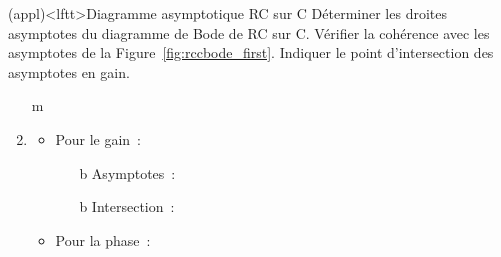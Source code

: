\documentclass[../../main/main.tex]{subfiles}
\begin{document}
\begin{tcb*}(appl)<lftt>{Diagramme asymptotique RC sur C}
	Déterminer les droites asymptotes du diagramme de Bode de RC sur C. Vérifier
	la cohérence avec les asymptotes de la Figure~\ref{fig:rccbode_first}.
	Indiquer le point d'intersection des asymptotes en gain.
	\tcblower
	\vspace{12pt}
	\begin{enumerate}
		\item[m]
		      \psw{%
			      \[
				      \boxed{
					      \Hu(x) \opto{}{x\to 0} \frac{1}{1 + 0} = 1
					      \qet
					      \Hu(x) \opto{}{x\to \infty} \frac{1}{\jx}
				      }%
			      \]
		      }%
		      \vspace{-15pt}
		\item
		      \begin{itemize}
			      \item Pour le gain~:
			            \begin{itemize}
				            \item[b]{Asymptotes}~:
				            \item[b]{Intersection}~:
				                  \vspace{-25pt}
			            \end{itemize}
			      \item Pour la phase~:
			            \psw{%
				            \[
					            \f(x) \opto{}{x\to 0} \arg*{1} = 0
					            \qet
					            \f(x) \opto{}{x\to \infty} \arg*{\frac{1}{\jx}} = -\frac{\pi}{2}
				            \]
			            }%
			            \vspace{-15pt}
		      \end{itemize}
	\end{enumerate}
\end{tcb*}
\end{document}
